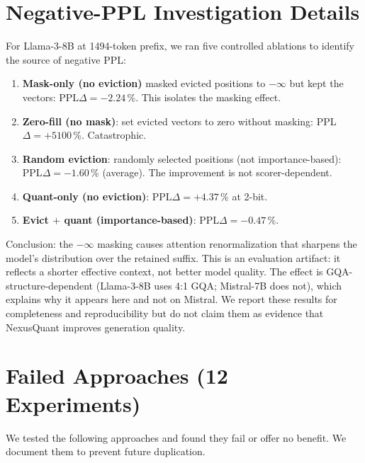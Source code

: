 \documentclass{article}
\begin{document}
\section{Negative-PPL Investigation Details}
\label{app:neg_ppl}

For Llama-3-8B at 1494-token prefix, we ran five controlled ablations to
identify the source of negative PPL:

\begin{enumerate}
  \item \textbf{Mask-only (no eviction)} masked evicted positions to $-\infty$
    but kept the vectors: PPL$\Delta = -2.24$\,\%. This isolates the masking effect.
  \item \textbf{Zero-fill (no mask)}: set evicted vectors to zero without masking:
    PPL$\Delta = +5100$\,\%. Catastrophic.
  \item \textbf{Random eviction}: randomly selected positions (not importance-based):
    PPL$\Delta = -1.60$\,\% (average). The improvement is not scorer-dependent.
  \item \textbf{Quant-only (no eviction)}: PPL$\Delta = +4.37$\,\% at 2-bit.
  \item \textbf{Evict $+$ quant (importance-based)}: PPL$\Delta = -0.47$\,\%.
\end{enumerate}

Conclusion: the $-\infty$ masking causes attention renormalization that sharpens
the model's distribution over the retained suffix. This is an evaluation artifact:
it reflects a shorter effective context, not better model quality. The effect is
GQA-structure-dependent (Llama-3-8B uses 4:1 GQA; Mistral-7B does not), which
explains why it appears here and not on Mistral. We report these results for
completeness and reproducibility but do not claim them as evidence that
NexusQuant improves generation quality.

\section{Failed Approaches (12 Experiments)}
\label{app:failures}

We tested the following approaches and found they fail or offer no benefit.
We document them to prevent future duplication.
\end{document}
